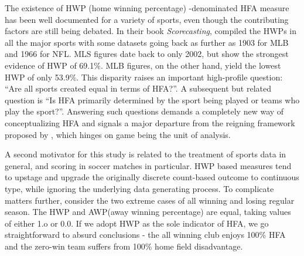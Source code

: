 \documentclass[USenglish]{article}
\begin{document}
The existence of HWP (home winning percentage) -denominated HFA measure has been well documented for a variety of sports, even though the contributing factors are still being debated. In their book \textit{Scorecasting}, \cite{moskowitz2012scorecasting} compiled the HWPs in all the major sports with some datasets going back as further as 1903 for MLB and 1966 for NFL. MLS figures date back to only 2002, but show the strongest evidence of HWP of 69.1\%. MLB figures, on the other hand, yield the lowest HWP of only 53.9\%. This disparity raises an important high-profile question: ``Are all sports created equal in terms of HFA?''. A subsequent but related question is ``Is HFA primarily determined by the sport being played or teams who play the sport?''. Answering such questions demands a completely new way of conceptualizing HFA and signals a major departure from the reigning framework proposed by \cite{Courneya1992}, which hinges on game being the unit of analysis.  






 



A second motivator for this study is related to the treatment of sports data in general, and scoring in soccer matches in particular. HWP based measures tend to upstage and upgrade the originally discrete count-based outcome to continuous type, while ignoring the underlying data generating process. To complicate matters further, consider the two extreme cases of all winning and losing regular season. The HWP and AWP(away winning percentage) are equal, taking values of either 1.o or 0.0. If we adopt HWP as the sole indicator of HFA, we go straightforward to absurd conclusions - the all winning club enjoys 100\% HFA and the zero-win team suffers from 100\% home field disadvantage.   
\end{document}
